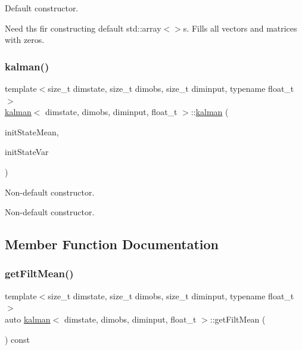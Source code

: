 Default constructor. 

Need ths fir constructing default std\+::array$<$$>$s. Fills all vectors and matrices with zeros. \mbox{\label{classkalman_a91ec8bcb52e26df651001d8f8e574373}} 
\subsubsection{\texorpdfstring{kalman()}{kalman()}\hspace{0.1cm}{\footnotesize\ttfamily [2/2]}}
{\footnotesize\ttfamily template$<$size\+\_\+t dimstate, size\+\_\+t dimobs, size\+\_\+t diminput, typename float\+\_\+t $>$ \\
\hyperlink{classkalman}{kalman}$<$ dimstate, dimobs, diminput, float\+\_\+t $>$\+::\hyperlink{classkalman}{kalman} (\begin{DoxyParamCaption}\item[{const \hyperlink{classcf__filter_ad4bce534d6b7a494dae851846037c94b}{ssv} \&}]{init\+State\+Mean,  }\item[{const \hyperlink{classkalman_a581550d9aba33245fb496b22a834831c}{ss\+Mat} \&}]{init\+State\+Var }\end{DoxyParamCaption})}



Non-\/default constructor. 

Non-\/default constructor. 

\subsection{Member Function Documentation}
\mbox{\label{classkalman_a247a3cef3a1fcec8c858372014276acf}} 
\subsubsection{\texorpdfstring{get\+Filt\+Mean()}{getFiltMean()}}
{\footnotesize\ttfamily template$<$size\+\_\+t dimstate, size\+\_\+t dimobs, size\+\_\+t diminput, typename float\+\_\+t $>$ \\
auto \hyperlink{classkalman}{kalman}$<$ dimstate, dimobs, diminput, float\+\_\+t $>$\+::get\+Filt\+Mean (\begin{DoxyParamCaption}{ }\end{DoxyParamCaption}) const}



